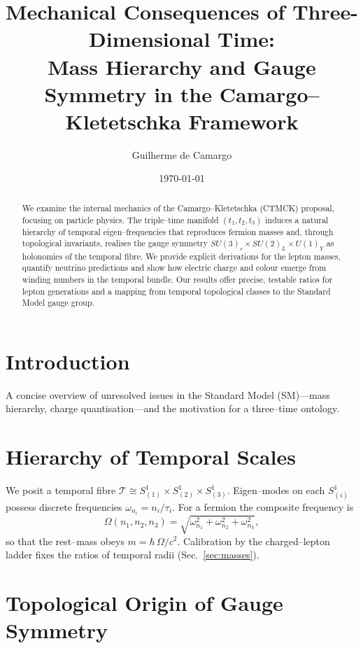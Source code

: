 \documentclass[aps,prd,reprint,amsmath,amssymb,nofootinbib]{revtex4-2}
\title{Mechanical Consequences of Three-Dimensional Time:\\ Mass Hierarchy and Gauge Symmetry in the Camargo--Kletetschka Framework}
\author{Guilherme de Camargo}
\affiliation{Independent Researcher, Londrina, Brazil}
\date{\today}
\begin{document}
\begin{abstract}
We examine the internal mechanics of the Camargo--Kletetschka (CTMCK) proposal, focusing on particle physics. The triple--time manifold $(t_1,t_2,t_3)$ induces a natural hierarchy of temporal eigen--frequencies that reproduces fermion masses and, through topological invariants, realises the gauge symmetry $SU(3)_c\times SU(2)_L\times U(1)_Y$ as holonomies of the temporal fibre. We provide explicit derivations for the lepton masses, quantify neutrino predictions and show how electric charge and colour emerge from winding numbers in the temporal bundle. Our results offer precise, testable ratios for lepton generations and a mapping from temporal topological classes to the Standard Model gauge group.
\end{abstract}
\maketitle


\section{Introduction}\label{sec:intro}
A concise overview of unresolved issues in the Standard Model (SM)---mass hierarchy, charge quantisation---and the motivation for a three--time ontology.

\section{Hierarchy of Temporal Scales}\label{sec:scales}
We posit a temporal fibre $\mathcal{T} \cong S^1_{(1)}\times S^1_{(2)}\times S^1_{(3)}$. Eigen--modes on each $S^1_{(i)}$ possess discrete frequencies $\omega_{n_i}=n_i/\tau_i$. For a fermion the composite frequency is
\begin{equation}
  \Omega(n_1,n_2,n_3)=\sqrt{\omega_{n_1}^2+\omega_{n_2}^2+\omega_{n_3}^2},
  \label{eq:Omega}
\end{equation}
so that the rest--mass obeys $m=\hbar\,\Omega/c^2$.  Calibration by the charged--lepton ladder fixes the ratios of temporal radii (Sec.~\ref{sec:masses}).

\section{Topological Origin of Gauge Symmetry}\label{sec:gauge}
\end{document}
